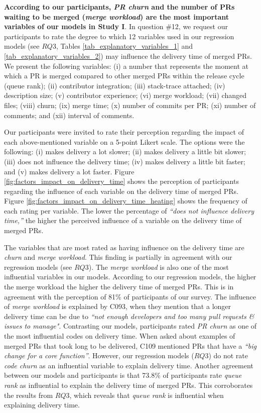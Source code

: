 \vspace{06.mm}
\noindent\textbf{According to our participants, \textit{PR churn} and the number of PRs waiting to be merged (\textit{merge workload}) are the most important variables of our models in Study I}. 
In question \#12, we request our participants to rate the degree to which 12 variables used in our regression models (see $RQ3$, Tables \ref{tab_explanatory_variables_1} and \ref{tab_explanatory_variables_2}) may influence the delivery time of merged PRs. We present the following variables: (i) a number that represents the moment at which a PR is merged compared to other merged PRs within the release cycle (queue rank); (ii) contributor integration; (iii) stack-trace attached; (iv) description size; (v) contributor experience; (vi) merge workload; (vii) changed files; (viii) churn; (ix) merge time; (x) number of commits per PR; (xi) number of comments; and (xii) interval of comments. 

Our participants were invited to rate their perception regarding the impact of each above-mentioned variable on a 5-point Likert scale. The options were the following: (i) makes delivery a lot slower; (ii) makes delivery a little bit slower; (iii) does not influence the delivery time; (iv) makes delivery a little bit faster; and (v) makes delivery a lot faster.
Figure \ref{fig:factors_impact_on_delivery_time} shows the perception of participants regarding the influence of each variable on the delivery time of merged PRs. Figure \ref{fig:factors_impact_on_delivery_time_heating} shows the frequency of each rating per variable. The lower the percentage of \textit{``does not influence delivery time,''} the higher the perceived influence of a variable on the delivery time of merged PRs.

The variables that are most rated as having influence on the delivery time are \textit{churn} and \textit{merge workload}. This finding is partially in agreement with our regression models (see $RQ3$). The \textit{merge workload} is also one of the most influential variables in our models. According to our regression models, the higher the merge workload the higher the delivery time of merged PRs. This is in agreement with the perception of 81\% of participants of our survey. 
The influence of \textit{merge workload} is explained by 
C093, when they mention that a longer delivery time can be due to \textit{``not enough developers and too many pull requests \& issues to manage"}. Contrasting our models, participants rated \textit{PR churn} as one of the most influential codes on delivery time. When asked about examples of merged PRs that took long to be delivered, 
C109 mentioned PRs that have a \textit{``big change for a core function''}.
However, our regression models ($RQ3$) do not rate \textit{code churn} as an influential variable to explain delivery time. Another agreement between our models and participants is that 73.8\% of participants rate \textit{queue rank} as influential to explain the delivery time of merged PRs. This corroborates the results from $RQ3$, which reveals that \textit{queue rank} is influential when explaining delivery time. 

